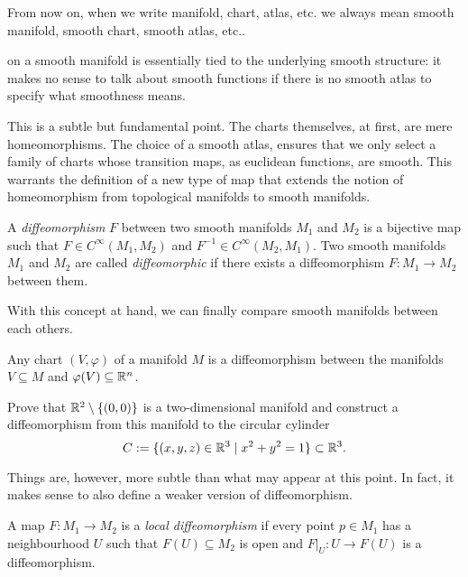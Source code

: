 \begin{tcolorbox}
	From now on, when we write manifold, chart, atlas, etc. we always mean smooth manifold, smooth chart, smooth atlas, etc..
\end{tcolorbox}

 on a smooth manifold is essentially tied to the underlying smooth structure: it makes no sense to talk about smooth functions if there is no smooth atlas to specify what smoothness means.

This is a subtle but fundamental point. The charts themselves, at first, are mere homeomorphisms.
The choice of a smooth atlas, ensures that we only select a family of charts whose transition maps, as euclidean functions, are smooth.
This warrants the definition of a new type of map that extends the notion of homeomorphism from topological manifolds to smooth manifolds.

\begin{definition}
	A \emph{diffeomorphism} $F$ between two smooth manifolds $M_1$ and $M_2$ is a bijective map such that $F\in C^\infty(M_1, M_2)$ and $F^{-1}\in C^\infty(M_2, M_1)$.
	Two smooth manifolds $M_1$ and $M_2$ are called \emph{diffeomorphic} if there exists a diffeomorphism $F:M_1\to M_2$ between them.
\end{definition}

With this concept at hand, we can finally compare smooth manifolds between each others.

\begin{exercise}\label{exe:charts-diffeo}
	Any chart $(V, \varphi)$ of a manifold $M$ is a diffeomorphism between the manifolds $V\subseteq M$ and $\varphi(V)\subseteq\mathbb{R}^n$.
\end{exercise}

\begin{exercise}
	Prove that $\mathbb{R}^2\setminus\{(0,0)\}$ is a two-dimensional manifold and construct a diffeomorphism from this manifold to the circular cylinder
	\begin{equation}
		C := \{ (x,y,z)\in\mathbb{R}^3 \mid x^2+y^2 = 1\}\subset\mathbb{R}^3.
	\end{equation}
\end{exercise}

Things are, however, more subtle than what may appear at this point.
In fact, it makes sense to also define a weaker version of diffeomorphism.

\begin{definition}
	A map $F : M_1 \to M_2$ is a \emph{local diffeomorphism} if every point $p\in M_1$ has a neighbourhood $U$ such that $F(U)\subseteq M_2$ is open and $F|_{U} : U \to F(U)$ is a diffeomorphism.
\end{definition}


